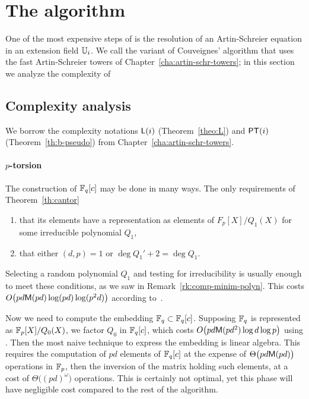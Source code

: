 

\section{The algorithm }
\label{sec:C2-AS}

One of the most expensive steps of \ctwo{} is the resolution of an
Artin-Schreier equation in an extension field $\mathbb{U}_i$. We call \ctwoas{}
the variant of Couveignes' algorithm that uses the fast Artin-Schreier
towers of Chapter~\ref{cha:artin-schr-towers}; in this section we
analyze the complexity of \ctwoas{}

\subsection{Complexity analysis}
\label{sec:C2-AS:complexity}
We borrow the complexity notations $\mathsf{L}(i)$ (Theorem~\ref{theo:L})
and $\mathsf{PT}(i)$ (Theorem~\ref{th:b-pseudo}) from
Chapter~\ref{cha:artin-schr-towers}.

\paragraph{$p$-torsion}
The construction of $\mathbb{F}_q[c]$ may be done in many ways. The only
requirements of Theorem~\ref{th:cantor}
\begin{enumerate}
\item that its elements have a representation as elements of
  $F_p[X]/Q_1(X)$ for some irreducible polynomial $Q_1$,
\item that either $(d,p)=1$ or $\deg Q_1' + 2 = \deg Q_1$.
\end{enumerate}
Selecting a random polynomial $Q_1$ and testing for irreducibility is
usually enough to meet these conditions, as we saw in
Remark~\ref{rk:comp-minim-polyn}.  This costs $O\bigl(pd\mathsf{M}(pd)\log
(pd)\log(p^2d)\bigr)$ according to~\cite[Th.  14.42]{vzGG}.

Now we need to compute the embedding $\mathbb{F}_q\subset\mathbb{F}_q[c]$. Supposing
$\mathbb{F}_q$ is represented as $\mathbb{F}_p[X]/Q_0(X)$, we factor $Q_0$ in
$\mathbb{F}_q[c]$, which costs $O\bigl(pd\mathsf{M}(pd^2)\log d\log p\bigr)$ using
\cite[Coro. 14.16]{vzGG}. Then the most naive technique to express the
embedding is linear algebra. This requires the computation of $pd$
elements of $\mathbb{F}_q[c]$ at the expense of $\Theta\bigl(pd\mathsf{M}(pd)\bigr)$
operations in $\mathbb{F}_p$, then the inversion of the matrix holding such
elements, at a cost of $\Theta\bigl((pd)^\omega\bigr)$ operations. This is
certainly not optimal, yet this phase will have negligible cost
compared to the rest of the algorithm.


